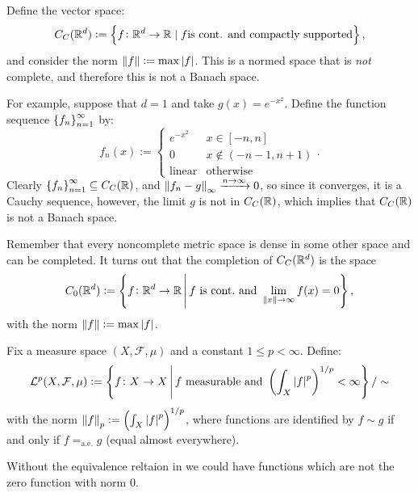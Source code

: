 \documentclass[11pt,a4paper]{article}
\begin{document}
\begin{example}
  Define the vector space:
  \[
    C_C(\mathbb{R}^d) :=
    \left\{f \colon \mathbb{R}^d \to \mathbb{R} \mid f \text{is cont. and compactly supported}\right\},
  \]
  and consider the norm $\left\lVert f\right\rVert := \max\left\lvert f\right\rvert$.
  This is a normed space that is \textit{not} complete,
  and therefore this is not a Banach space.

  For example, suppose that $d = 1$ and take $g(x) = e^{-x^2}$.
  Define the function sequence $\left\{f_n\right\}_{n=1}^{\infty}$
  by:
  \[
    f_{n}(x) :=
    \begin{cases}
      e^{-x^2} &x \in [-n,n] \\
      0 &x \notin (-n-1,n+1) \\
      \text{linear} &\text{otherwise}
    \end{cases}.
  \]
  Clearly $\left\{f_n\right\}_{n=1}^{\infty} \subseteq C_C(\mathbb{R})$,
  and $\left\lVert f_n - g\right\rVert_{\infty} \xrightarrow{n \to \infty} 0$,
  so since it converges, it is a Cauchy sequence,
  however, the limit $g$ is not in $C_C(\mathbb{R})$,
  which implies that $C_C(\mathbb{R})$ is not a Banach space.
\end{example}

\begin{remark}
  Remember that every noncomplete metric space is dense in some other
  space and can be completed.
  It turns out that the completion of $C_C(\mathbb{R}^d)$
  is the space
  \[
    C_0(\mathbb{R}^d) :=
    \left\{f \colon \mathbb{R}^d \to \mathbb{R} \,\middle\vert\, f \text{ is cont.} \text{ and }
      \lim_{\left\lVert x\right\rVert \to \infty} f(x) = 0\right\},
  \]
  with the norm $\left\lVert f\right\rVert := \max\left\lvert f\right\rvert$.
\end{remark}


\begin{definition}[$\L^p$ spaces]
  \label{def:Lp-spaces}
  Fix a measure space $(X,\mathcal F,\mu)$
  and a constant $1 \le p < \infty$.
  Define:
  \[
    \L^p(X,\mathcal F,\mu) :=
    \set{f \colon X \to X \,\middle\vert\, f \text{ measurable} \stand
      \del{\int_{X} \abs{f}^p}^{1/p} < \infty} / \sim
  \]
  with the norm $\norm{f}_{p} := \del{\int_{X} \abs{f}^p}^{1/p}$,
  where functions are identified by $f \sim g$ if and only if
  $f =_{\text{a.e.}} g$ (equal almost everywhere).
\end{definition}
\begin{remark}
  Without the equivalence reltaion in 
  we could have functions which are not the zero function
  with norm $0$.
\end{remark}
\end{document}
